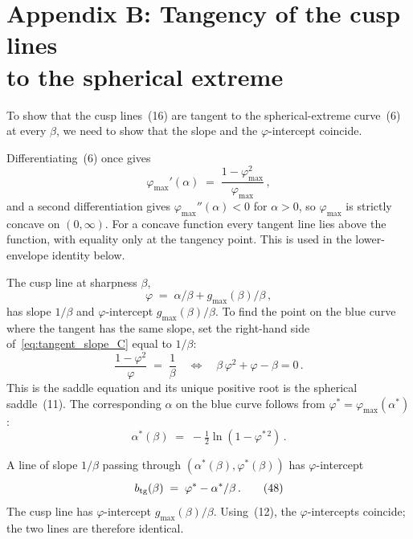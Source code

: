 \documentclass[letterpaper]{article} %
\newcommand{\Bnet}{\beta}
\begin{document}
\section{Appendix B: Tangency of the cusp lines \\to the spherical extreme}

To show that the cusp lines~(16) are tangent to the
spherical-extreme curve~(6) at every
$\Bnet$, we need to show that the slope and the $\varphi$-intercept
coincide.

Differentiating~(6) once gives
\begin{equation}
\varphi_{\max}'(\alpha) \;=\; \frac{1-\varphi_{\max}^2}{\varphi_{\max}}\,,
\tag{44}
\label{eq:tangent_slope_C}
\end{equation}
and a second differentiation gives $\varphi_{\max}''(\alpha) < 0$ for $\alpha > 0$,
so $\varphi_{\max}$ is strictly concave on $(0, \infty)$. For a concave function
every tangent line lies above the function, with equality only at the tangency
point. This is used in the lower-envelope identity below.

The cusp line at sharpness $\Bnet$,
\begin{equation}
\varphi \;=\; \alpha/\Bnet + g_{\max}(\Bnet)/\Bnet\,,
\tag{45}
\end{equation}
has slope $1/\Bnet$ and $\varphi$-intercept $g_{\max}(\Bnet)/\Bnet$. To find the point on
the blue curve where the tangent has the same slope, set the right-hand side
of~\eqref{eq:tangent_slope_C} equal to $1/\Bnet$:
\begin{equation}
\frac{1-\varphi^2}{\varphi} \;=\; \frac{1}{\Bnet}
\quad\Longleftrightarrow\quad
\Bnet\,\varphi^2 + \varphi - \Bnet = 0\,.
\tag{46}
\label{eq:saddle_eq_C}
\end{equation}
This is the saddle equation and its unique positive root is the spherical saddle~(11).
The corresponding $\alpha$ on the blue curve follows from
$\varphi^* = \varphi_{\max}(\alpha^*)$:
\begin{equation}
\alpha^*(\Bnet) \;=\; -\tfrac12 \ln(1-\varphi^{*\,2})\,.
\tag{47}
\label{eq:alpha_star_C}
\end{equation}

A line of slope $1/\Bnet$ passing through $(\alpha^*(\Bnet), \varphi^*(\Bnet))$ has
$\varphi$-intercept
\begin{equation}
b_{\rm tg}(\Bnet) \;=\; \varphi^* - \alpha^*/\Bnet\,.
\tag{48}
\end{equation}
The cusp line has $\varphi$-intercept $g_{\max}(\Bnet)/\Bnet$.
Using~(12), the $\varphi$-intercepts coincide;
the two lines are therefore identical.
\end{document}
